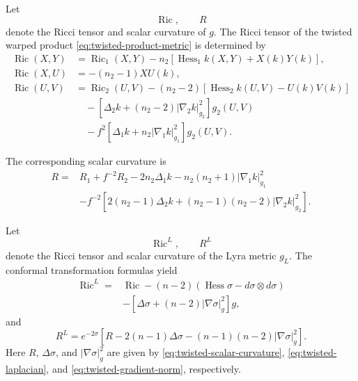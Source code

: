 \documentclass[a4paper,11pt]{article}
\theoremstyle{plain}
\numberwithin{equation}{section}
\begin{document}
Let
\[
\operatorname{Ric},
\qquad
R
\]
denote the Ricci tensor and scalar curvature of \(g\). The Ricci
tensor of the twisted warped product
\eqref{eq:twisted-product-metric} is determined by
\begin{subequations}
	\label{eq:twisted-ricci-components}
	\begin{align}
		\operatorname{Ric}(X,Y)
		&=
		\operatorname{Ric}_{1}(X,Y)
		-
		n_{2}
		\left[
		\operatorname{Hess}_{1}k(X,Y)
		+
		X(k)Y(k)
		\right],
		\label{eq:twisted-ricci-horizontal}
		\\
		\operatorname{Ric}(X,U)
		&=
		-
		(n_{2}-1)XU(k),
		\label{eq:twisted-ricci-mixed}
		\\
		\operatorname{Ric}(U,V)
		&=
		\operatorname{Ric}_{2}(U,V)
		-
		(n_{2}-2)
		\left[
		\operatorname{Hess}_{2}k(U,V)
		-
		U(k)V(k)
		\right]
		\nonumber\\
		&\quad
		-
		\left[
		\Delta_{2}k
		+
		(n_{2}-2)
		\lvert\nabla_{2}k\rvert_{g_{2}}^{2}
		\right]g_{2}(U,V)
		\nonumber\\
		&\quad
		-
		f^{2}
		\left[
		\Delta_{1}k
		+
		n_{2}
		\lvert\nabla_{1}k\rvert_{g_{1}}^{2}
		\right]g_{2}(U,V).
		\label{eq:twisted-ricci-vertical}
	\end{align}
\end{subequations}

The corresponding scalar curvature is
\begin{align}
	R
	={}&
	R_{1}
	+
	f^{-2}R_{2}
	-
	2n_{2}\Delta_{1}k
	-
	n_{2}(n_{2}+1)
	\lvert\nabla_{1}k\rvert_{g_{1}}^{2}
	\nonumber\\
	&-
	f^{-2}
	\left[
	2(n_{2}-1)\Delta_{2}k
	+
	(n_{2}-1)(n_{2}-2)
	\lvert\nabla_{2}k\rvert_{g_{2}}^{2}
	\right].
	\label{eq:twisted-scalar-curvature}
\end{align}

Let
\[
\operatorname{Ric}^{L},
\qquad
R^{L}
\]
denote the Ricci tensor and scalar curvature of the Lyra metric
\(g_{L}\). The conformal transformation formulas
\cite{Besse2008} yield
\begin{align}
	\operatorname{Ric}^{L}
	={}&
	\operatorname{Ric}
	-
	(n-2)
	\left(
	\operatorname{Hess}\sigma
	-
	d\sigma\otimes d\sigma
	\right)
	\nonumber\\
	&-
	\left[
	\Delta\sigma
	+
	(n-2)\lvert\nabla\sigma\rvert_{g}^{2}
	\right]g,
	\label{eq:lyra-ricci-transformation}
\end{align}
and
\begin{equation}
	R^{L}
	=
	e^{-2\sigma}
	\left[
	R
	-
	2(n-1)\Delta\sigma
	-
	(n-1)(n-2)
	\lvert\nabla\sigma\rvert_{g}^{2}
	\right].
	\label{eq:lyra-scalar-transformation}
\end{equation}
Here \(R\), \(\Delta\sigma\), and
\(\lvert\nabla\sigma\rvert_{g}^{2}\) are given by
\eqref{eq:twisted-scalar-curvature},
\eqref{eq:twisted-laplacian}, and
\eqref{eq:twisted-gradient-norm}, respectively.
\end{document}
